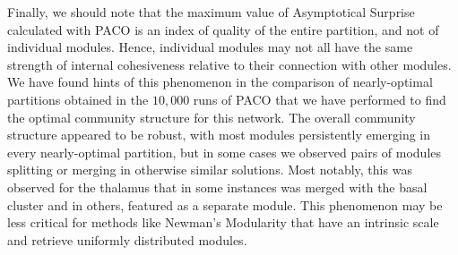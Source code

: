 Finally, we should note that the maximum value of Asymptotical Surprise calculated with PACO is an index of quality of the entire partition, and not of individual modules.
Hence, individual modules may not all have the same strength of internal cohesiveness relative to their connection with other modules.
We have found hints of this phenomenon in the comparison of nearly-optimal partitions obtained in the $10,000$ runs of PACO that we have performed to find the optimal community structure for this network.
The overall community structure appeared to be robust, with most modules persistently emerging in every nearly-optimal partition, but in some cases we observed pairs of modules splitting or merging in otherwise similar solutions. Most notably, this was observed for the thalamus that in some instances was merged with the basal cluster and in others, featured as a separate module.
This phenomenon may be less critical for methods like Newman's Modularity that have an intrinsic scale and retrieve uniformly distributed modules.

